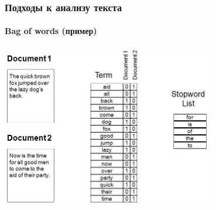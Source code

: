 \documentclass[10pt]{beamer}
\begin{document}

\begin{frame}
\frametitle{Подходы к анализу текста}
\framesubtitle{Bag of words (пример)}

\begin{center}
	\includegraphics[width=0.7\textwidth]{images/bag_of_words.jpg} 
\end{center}

\end{frame}

\end{document}
